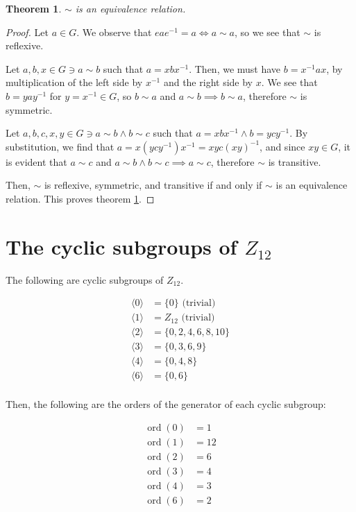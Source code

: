 \documentclass[12pt]{article}
\newcommand{\ord}{\operatorname{ord}}
\newtheorem{thm}{Theorem}
\begin{document}
\begin{thm} \label{thm11}
	$\sim$ is an equivalence relation.
\end{thm}

\begin{proof}
	Let $a \in G$.
	We observe that $eae^{-1} = a \iff a \sim a$,
	so we see that
	$\sim$ is reflexive.

	Let $a,b,x \in G \ni a \sim b$
	such that $a = xbx^{-1}$.
	Then, we must have $b = x^{-1}ax$,
	by multiplication of the left side by $x^{-1}$
	and the right side by $x$.
	We see that $b = yay^{-1}$ for $y = x^{-1} \in G$,
	so $b \sim a$ and $a \sim b \implies b \sim a$,
	therefore $\sim$ is symmetric.

	Let $a,b,c,x,y \in G \ni a \sim b \land b \sim c$
	such that $a = xbx^{-1} \land b = ycy^{-1}$.
	By substitution, we find that
	$a = x(ycy^{-1})x^{-1} = xyc(xy)^{-1}$,
	and since $xy \in G$, it is evident that
	$a \sim c$ and $a \sim b \land b \sim c \implies a \sim c$,
	therefore $\sim$ is transitive.

	Then,
	$\sim$ is
	reflexive,
	symmetric,
	and transitive
	if and only if
	$\sim$ is an equivalence relation.
	This proves theorem \ref{thm11}.
\end{proof}

\section{The cyclic subgroups of $Z_{12}$}

The following are cyclic subgroups of $Z_{12}$.

\begin{align}
	\langle 0 \rangle & = \{0\} \text{ (trivial)} \\
	\langle 1 \rangle & = Z_{12} \text{ (trivial)} \\
	\langle 2 \rangle & = \{0, 2, 4, 6, 8, 10 \} \\
	\langle 3 \rangle & = \{0, 3, 6, 9 \} \\
	\langle 4 \rangle & = \{0, 4, 8 \} \\
	\langle 6 \rangle & = \{0, 6 \} \\
\end{align}

Then, the following are the orders of the generator of each cyclic subgroup:

\begin{align}
	\ord(0) & = 1 \\
	\ord(1) & = 12 \\
	\ord(2) & = 6 \\
	\ord(3) & = 4 \\
	\ord(4) & = 3 \\
	\ord(6) & = 2
\end{align}
\end{document}
